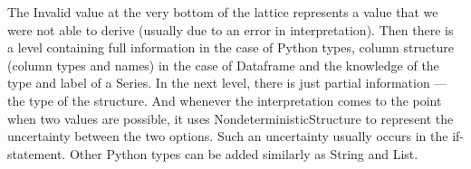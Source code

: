 The Invalid value at the very bottom of the lattice represents a value that we were not able to derive
(usually due to an error in interpretation).
Then there is a level containing full information in the case of Python types, column structure (column types and names)
in the case of Dataframe and the knowledge of the type and label of a Series.
In the next level, there is just partial information --- the type of the structure.
And whenever the interpretation comes to the point when two values are possible, it uses NondeterministicStructure
to represent the uncertainty between the two options.
Such an uncertainty usually occurs in the if-statement.
Other Python types can be added similarly as String and List.